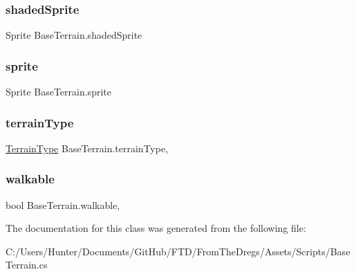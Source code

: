 \mbox{\label{class_base_terrain_a6e60ba346bed94af204ded4f7fcf16ab}} 
\subsubsection{\texorpdfstring{shadedSprite}{shadedSprite}}
{\footnotesize\ttfamily Sprite Base\+Terrain.\+shaded\+Sprite\hspace{0.3cm}{\ttfamily [get]}}

\mbox{\label{class_base_terrain_a0af7f55356e035cde6cedadae6fbb34d}} 
\subsubsection{\texorpdfstring{sprite}{sprite}}
{\footnotesize\ttfamily Sprite Base\+Terrain.\+sprite\hspace{0.3cm}{\ttfamily [get]}}

\mbox{\label{class_base_terrain_a381e5f59e57a301a70f79c32cf3ea300}} 
\subsubsection{\texorpdfstring{terrainType}{terrainType}}
{\footnotesize\ttfamily \mbox{\hyperlink{class_base_terrain_a5b782f4de5e1a2ca1343b4aa89a7dc9a}{Terrain\+Type}} Base\+Terrain.\+terrain\+Type\hspace{0.3cm}{\ttfamily [get]}, {\ttfamily [set]}}

\mbox{\label{class_base_terrain_a403d7a199581bc910ecbf15009b532a6}} 
\subsubsection{\texorpdfstring{walkable}{walkable}}
{\footnotesize\ttfamily bool Base\+Terrain.\+walkable\hspace{0.3cm}{\ttfamily [get]}, {\ttfamily [set]}}



The documentation for this class was generated from the following file\+:\begin{DoxyCompactItemize}
\item 
C\+:/\+Users/\+Hunter/\+Documents/\+Git\+Hub/\+F\+T\+D/\+From\+The\+Dregs/\+Assets/\+Scripts/Base\+Terrain.\+cs\end{DoxyCompactItemize}
